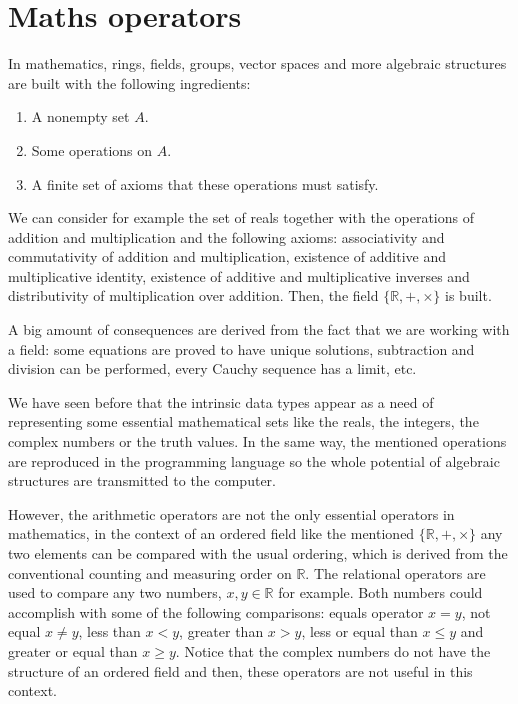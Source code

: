 \newpage
    \section{Maths operators}
In mathematics, rings, fields, groups, vector spaces and more algebraic structures 
are built with the following ingredients:
\begin{enumerate}[noitemsep]
    \item A nonempty set $A$.
    \item Some operations on $A$.
    \item A finite set of axioms that these operations must satisfy.   
\end{enumerate}
We can consider for example the set of reals together 
with the operations of addition and multiplication 
and the following axioms: 
associativity and commutativity of addition and multiplication, 
existence of additive and multiplicative identity,
existence of additive and multiplicative inverses and
distributivity of multiplication over addition.
Then, the field $\{\mathbb{R}, +, \times\}$ is built. 

A big amount of consequences are derived from the fact that we are working with a field:
some equations are proved to have unique solutions, subtraction and division
can be performed, every Cauchy sequence has a limit, etc. 

We have seen before that the intrinsic data types appear as a need of representing 
some essential mathematical sets like the reals, the integers, the complex numbers or
the truth values. 
In the same way, the mentioned operations are reproduced in the programming language 
so the whole potential of algebraic structures are transmitted to the computer. 

However, the arithmetic operators are not the only essential operators in mathematics, 
in the context of an ordered field like the mentioned $\{\mathbb{R}, +, \times\}$
any two elements can be compared with the usual ordering, which is derived from the 
conventional counting and measuring order on $\mathbb{R}$. 
The relational operators are used to compare any two numbers, $x, y \in \mathbb{R}$ for example. 
Both numbers could accomplish with some of the following comparisons: 
equals operator $x = y$, not equal $x\neq y$, less than $x < y$, greater than $x > y$, less or equal than $x \leq y$ and greater or equal than $x\geq y$. 
Notice that the complex numbers do not have the structure of an ordered field and then, these operators are not useful in this context. 


